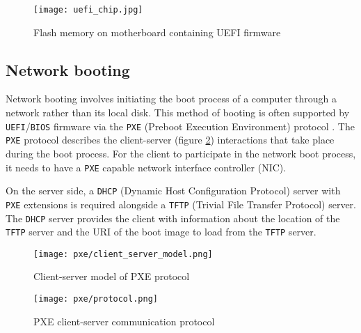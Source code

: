 \documentclass[../main.tex]{subfiles}
\begin{document}
\begin{figure}[H]
  \centering
  \texttt{[image: uefi\_chip.jpg]}
  \caption{Flash memory on motherboard containing UEFI firmware \cite{uefi_chip_img_ref}}
  \label{fig:uefi_chip}
\end{figure}

\subsection{Network booting}

Network booting involves initiating the boot process of a computer through a network rather than its local disk.
This method of booting is often supported by \texttt{UEFI}/\texttt{BIOS} firmware via the
\texttt{PXE} (Preboot Execution Environment) protocol \cite{pxespec}. The \texttt{PXE} protocol
describes the client-server (figure \ref{fig:pxe_client_server_model}) interactions that take place during the boot process.
For the client to participate in the network boot process, it needs to have a \texttt{PXE} capable network interface controller (NIC).

On the server side, a \texttt{DHCP} (Dynamic Host Configuration Protocol) server with \texttt{PXE} extensions is required
alongside a \texttt{TFTP} (Trivial File Transfer Protocol) server. The \texttt{DHCP} server provides the client with
information about the location of the \texttt{TFTP} server and the URI of the boot image to load from the \texttt{TFTP} server.

\begin{figure}[H]
  \centering
  \texttt{[image: pxe/client\_server\_model.png]}
  \caption{Client-server model of PXE protocol \cite{pxespec}}
  \label{fig:pxe_client_server_model}
\end{figure}

\begin{figure}[H]
  \centering
  \texttt{[image: pxe/protocol.png]}
  \caption{PXE client-server communication protocol \cite{pxespec_protocol}}
  \label{fig:pxe_protocol}
\end{figure}
\end{document}
